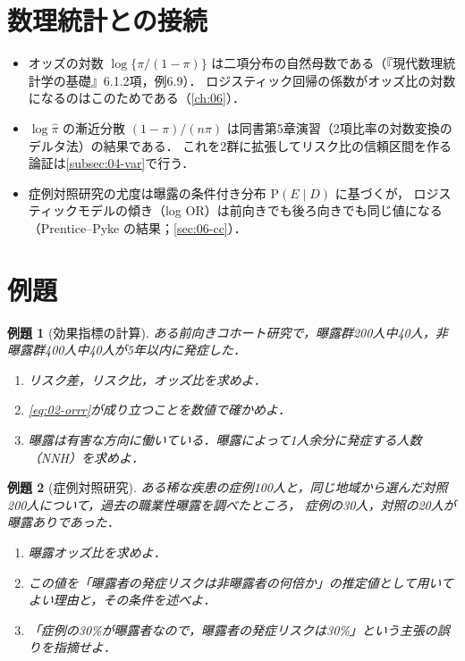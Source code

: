 \documentclass[a4paper,11pt,openany]{ltjsbook}
\newtheorem{reidai}{例題}[chapter]
\newcommand{\Prob}{\mathrm{P}}
\begin{document}
\section{数理統計との接続}\label{sec:02-link}
\begin{linkbox}
\begin{itemize}
\item オッズの対数 $\log\{\pi/(1-\pi)\}$ は二項分布の自然母数である（『現代数理統計学の基礎』6.1.2項，例6.9）．
      ロジスティック回帰の係数がオッズ比の対数になるのはこのためである（\cref{ch:06}）．
\item $\log\hat\pi$ の漸近分散 $(1-\pi)/(n\pi)$ は同書第5章演習（2項比率の対数変換のデルタ法）の結果である．
      これを2群に拡張してリスク比の信頼区間を作る論証は\cref{subsec:04-var}で行う．
\item 症例対照研究の尤度は曝露の条件付き分布 $\Prob(E\mid D)$ に基づくが，
      ロジスティックモデルの傾き（log OR）は前向きでも後ろ向きでも同じ値になる（Prentice--Pyke の結果；\cref{sec:06-cc}）．
\end{itemize}
\end{linkbox}

\section{例題}\label{sec:02-ex}
\begin{reidai}[効果指標の計算]\label{reidai:02-1}
ある前向きコホート研究で，曝露群200人中40人，非曝露群400人中40人が5年以内に発症した．
\begin{enumerate}[label=(\arabic*)]
\item リスク差，リスク比，オッズ比を求めよ．
\item \cref{eq:02-orrr}が成り立つことを数値で確かめよ．
\item 曝露は有害な方向に働いている．曝露によって1人余分に発症する人数（NNH）を求めよ．
\end{enumerate}
\end{reidai}

\begin{reidai}[症例対照研究]\label{reidai:02-2}
ある稀な疾患の症例100人と，同じ地域から選んだ対照200人について，過去の職業性曝露を調べたところ，
症例の30人，対照の20人が曝露ありであった．
\begin{enumerate}[label=(\arabic*)]
\item 曝露オッズ比を求めよ．
\item この値を「曝露者の発症リスクは非曝露者の何倍か」の推定値として用いてよい理由と，その条件を述べよ．
\item 「症例の30\%が曝露者なので，曝露者の発症リスクは30\%」という主張の誤りを指摘せよ．
\end{enumerate}
\end{reidai}
\end{document}
